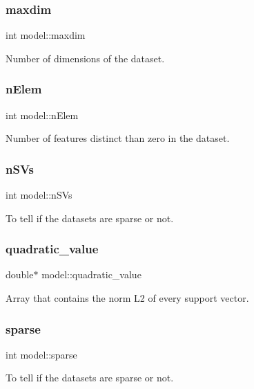 \subsubsection{\texorpdfstring{maxdim}{maxdim}}
{\ttfamily int model\+::maxdim}

Number of dimensions of the dataset. \hypertarget{structmodel_a4877089d41daf2186482e0e6f900d65f}{}\label{structmodel_a4877089d41daf2186482e0e6f900d65f} 
\subsubsection{\texorpdfstring{n\+Elem}{nElem}}
{\ttfamily int model\+::n\+Elem}

Number of features distinct than zero in the dataset. \hypertarget{structmodel_a3b73d79940bbdae365676c4fa56e96ea}{}\label{structmodel_a3b73d79940bbdae365676c4fa56e96ea} 
\subsubsection{\texorpdfstring{n\+S\+Vs}{nSVs}}
{\ttfamily int model\+::n\+S\+Vs}

To tell if the datasets are sparse or not. \hypertarget{structmodel_a623da3d1f5116fd4d66873b95eb2e720}{}\label{structmodel_a623da3d1f5116fd4d66873b95eb2e720} 
\subsubsection{\texorpdfstring{quadratic\+\_\+value}{quadratic\_value}}
{\ttfamily double$\ast$ model\+::quadratic\+\_\+value}

Array that contains the norm L2 of every support vector. \hypertarget{structmodel_ad00b5b9bbafcd18eb6367c90d9471231}{}\label{structmodel_ad00b5b9bbafcd18eb6367c90d9471231} 
\subsubsection{\texorpdfstring{sparse}{sparse}}
{\ttfamily int model\+::sparse}

To tell if the datasets are sparse or not. \hypertarget{structmodel_a658dab89d4b4b1a5bd28cdfb4abafe39}{}\label{structmodel_a658dab89d4b4b1a5bd28cdfb4abafe39} 
